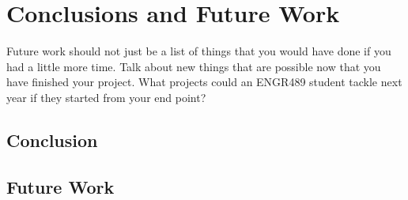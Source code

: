 \chapter{Conclusions and Future Work}\label{C:conclusion}

Future work should not just be a list of things that you would have done if you had a little more time. Talk about new things that are possible now that you have finished your project. What projects could an ENGR489 student tackle next year if they started from your end point?

\section{Conclusion}

\section{Future Work}